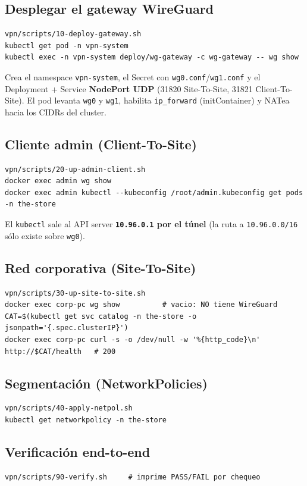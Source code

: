 \documentclass[11pt,a4paper]{article}
\newcommand{\cmd}[1]{\texttt{#1}}
\begin{document}
\subsection{Desplegar el gateway WireGuard}
\begin{lstlisting}
vpn/scripts/10-deploy-gateway.sh
kubectl get pod -n vpn-system
kubectl exec -n vpn-system deploy/wg-gateway -c wg-gateway -- wg show
\end{lstlisting}
Crea el namespace \cmd{vpn-system}, el Secret con \cmd{wg0.conf}/\cmd{wg1.conf} y
el Deployment + Service \textbf{NodePort UDP} (31820 Site-To-Site, 31821
Client-To-Site). El pod levanta \cmd{wg0} y \cmd{wg1}, habilita \cmd{ip\_forward}
(initContainer) y NATea hacia los CIDRs del cluster.

\subsection{Cliente admin (Client-To-Site)}
\begin{lstlisting}
vpn/scripts/20-up-admin-client.sh
docker exec admin wg show
docker exec admin kubectl --kubeconfig /root/admin.kubeconfig get pods -n the-store
\end{lstlisting}
El \cmd{kubectl} sale al API server \textbf{\cmd{10.96.0.1} por el túnel} (la ruta
a \cmd{10.96.0.0/16} sólo existe sobre \cmd{wg0}).

\subsection{Red corporativa (Site-To-Site)}
\begin{lstlisting}
vpn/scripts/30-up-site-to-site.sh
docker exec corp-pc wg show          # vacio: NO tiene WireGuard
CAT=$(kubectl get svc catalog -n the-store -o jsonpath='{.spec.clusterIP}')
docker exec corp-pc curl -s -o /dev/null -w '%{http_code}\n' http://$CAT/health   # 200
\end{lstlisting}

\subsection{Segmentación (NetworkPolicies)}
\begin{lstlisting}
vpn/scripts/40-apply-netpol.sh
kubectl get networkpolicy -n the-store
\end{lstlisting}

\subsection{Verificación end-to-end}
\begin{lstlisting}
vpn/scripts/90-verify.sh     # imprime PASS/FAIL por chequeo
\end{lstlisting}
\end{document}
